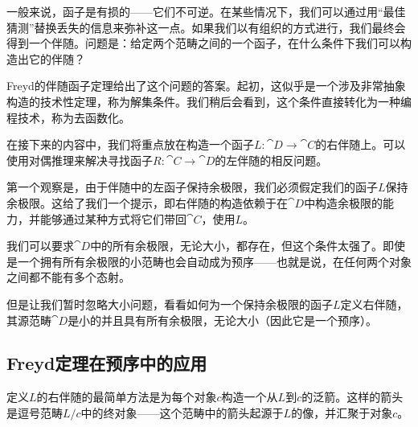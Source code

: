 \documentclass[DaoFP]{subfiles}
\begin{document}
    一般来说，函子是有损的——它们不可逆。在某些情况下，我们可以通过用“最佳猜测”替换丢失的信息来弥补这一点。如果我们以有组织的方式进行，我们最终会得到一个伴随。问题是：给定两个范畴之间的一个函子，在什么条件下我们可以构造出它的伴随？

    Freyd的伴随函子定理给出了这个问题的答案。起初，这似乎是一个涉及非常抽象构造的技术性定理，称为解集条件。我们稍后会看到，这个条件直接转化为一种编程技术，称为去函数化。

    在接下来的内容中，我们将重点放在构造一个函子$L \colon \cat D \to \cat C$的右伴随上。可以使用对偶推理来解决寻找函子$R \colon \cat C \to \cat D$的左伴随的相反问题。

    第一个观察是，由于伴随中的左函子保持余极限，我们必须假定我们的函子$L$保持余极限。这给了我们一个提示，即右伴随的构造依赖于在$\cat D$中构造余极限的能力，并能够通过某种方式将它们带回$\cat C$，使用$L$。

    我们可以要求$\cat D$中的所有余极限，无论大小，都存在，但这个条件太强了。即使是一个拥有所有余极限的小范畴也会自动成为预序——也就是说，在任何两个对象之间都不能有多个态射。

    但是让我们暂时忽略大小问题，看看如何为一个保持余极限的函子$L$定义右伴随，其源范畴$\cat D$是小的并且具有所有余极限，无论大小（因此它是一个预序）。

    \subsection{Freyd定理在预序中的应用}

    定义$L$的右伴随的最简单方法是为每个对象$c$构造一个从$L$到$c$的泛箭。这样的箭头是逗号范畴$L/c$中的终对象——这个范畴中的箭头起源于$L$的像，并汇聚于对象$c$。
\end{document}

